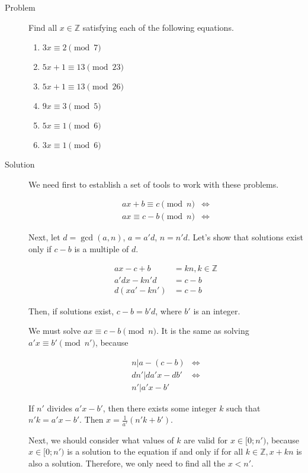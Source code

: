 \begin{description}
\item[Problem] Find all $x \in \mathbb Z$ satisfying each of the following
equations.

\begin{multicols}{2}
\begin{enumerate}
\item $3x \equiv 2 \pmod 7$
\item $5x + 1 \equiv 13 \pmod {23}$
\item $5x + 1 \equiv 13 \pmod {26}$
\item $9x \equiv 3 \pmod 5$
\item $5x \equiv 1 \pmod 6$
\item $3x \equiv 1 \pmod 6$
\end{enumerate}
\end{multicols}

\item[Solution] We need first to establish a set of tools to work with these
problems.

\begin{align*}
ax + b \equiv c \pmod n &\iff \\
ax \equiv c - b \pmod n &\iff
\end{align*}

Next, let $d = \gcd(a, n)$, $a = a' d$, $n = n' d$. Let's show that solutions
exist only if $c - b$ is a multiple of $d$.

\begin{align*}
ax - c + b &= kn, k \in \mathbb Z \\
a' d x - k n' d &= c - b \\
d (x a' - k n') &= c - b
\end{align*}

Then, if solutions exist, $c - b = b' d$, where $b'$ is an integer.

We must solve $ax \equiv c - b \pmod n$. It is the same as solving $a'x \equiv
b' \pmod {n'}$, because

\begin{align*}
n | a - (c - b) &\iff \\
d n' | d a' x - db' &\iff \\
n' | a' x - b'
\end{align*}

If $n'$ divides $a' x - b'$, then there exists some integer $k$ such that $n' k
= a' x - b'$. Then $x = \frac 1 {a'} (n' k + b')$.

Next, we should consider what values of $k$ are valid for $x \in [0; n')$,
because $x \in [0; n')$ is a solution to the equation if and only if for all $k
\in \mathbb Z, x + kn$ is also a solution. Therefore, we only need to find all
the $x < n'$.


\end{description}
